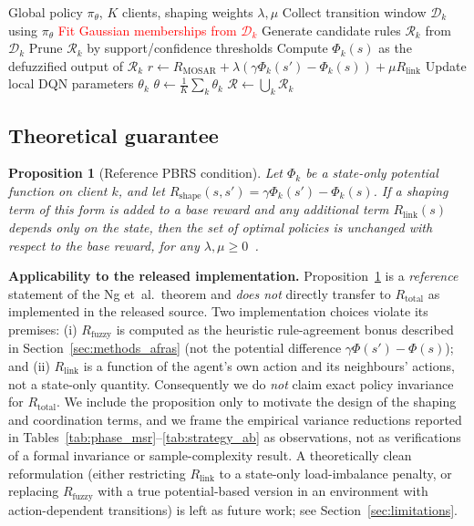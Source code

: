 \documentclass[journal]{IEEEtran}
\newtheorem{proposition}[theorem]{Proposition}
\newcommand{\rev}[1]{\textcolor{red}{#1}}
\begin{document}
\begin{algorithm}[!htbp]
\caption{AFRAS-FL training round}\label{alg:afras_fl}
\begin{algorithmic}[1]
\Require Global policy $\pi_\theta$, $K$ clients, shaping weights
 $\lambda,\mu$
  \State Collect transition window $\mathcal{D}_k$ using $\pi_\theta$
  \State \rev{Fit Gaussian memberships from $\mathcal{D}_k$}
  \State Generate candidate rules $\mathcal{R}_k$ from $\mathcal{D}_k$
  \State Prune $\mathcal{R}_k$ by support/confidence thresholds
  \State Compute $\Phi_k(s)$ as the defuzzified output of $\mathcal{R}_k$
    \State $r \gets R_{\text{MOSAR}}
             + \lambda(\gamma \Phi_k(s') - \Phi_k(s))
             + \mu R_{\text{link}}$
  \EndFor
  \State Update local DQN parameters $\theta_k$
\EndFor
\State $\theta \gets \tfrac{1}{K}\sum_k \theta_k$
\State $\mathcal{R} \gets \bigcup_k \mathcal{R}_k$ 
\end{algorithmic}
\end{algorithm}

\subsection{Theoretical guarantee}\label{sec:methods_theory}

\begingroup\color{red}
\begin{proposition}[Reference PBRS condition]\label{prop:invariance}
Let $\Phi_k$ be a state-only potential function on client $k$, and let
$R_{\text{shape}}(s,s') = \gamma \Phi_k(s') - \Phi_k(s)$. If a shaping
term of this form is added to a base reward and any additional term
$R_{\text{link}}(s)$ depends only on the state, then the set of optimal
policies is unchanged with respect to the base reward, for any
$\lambda, \mu \ge 0$~\cite{ng1999policy_invariance}.
\end{proposition}

\textbf{Applicability to the released implementation.}
Proposition~\ref{prop:invariance} is a \emph{reference} statement of the
Ng et~al.\ theorem and \emph{does not} directly transfer to
$R_{\text{total}}$ as implemented in the released source. Two
implementation choices violate its premises:
(i) $R_{\text{fuzzy}}$ is computed as the heuristic rule-agreement bonus
described in Section~\ref{sec:methods_afras} (not the potential
difference $\gamma \Phi(s') - \Phi(s)$); and
(ii) $R_{\text{link}}$ is a function of the agent's own action and its
neighbours' actions, not a state-only quantity.
Consequently we do \emph{not} claim exact policy invariance for
$R_{\text{total}}$. We include the proposition only to motivate the
design of the shaping and coordination terms, and we frame the
empirical variance reductions reported in
Tables~\ref{tab:phase_msr}--\ref{tab:strategy_ab} as observations, not
as verifications of a formal invariance or sample-complexity result. A
theoretically clean reformulation (either restricting $R_{\text{link}}$
to a state-only load-imbalance penalty, or replacing $R_{\text{fuzzy}}$
with a true potential-based version in an environment with
action-dependent transitions) is left as future work; see
Section~\ref{sec:limitations}.
\endgroup
\end{document}
